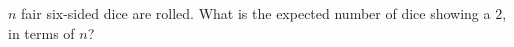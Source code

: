 $n$ fair six-sided dice are rolled. What is the expected number of dice showing a $2$, in terms of $n$?

